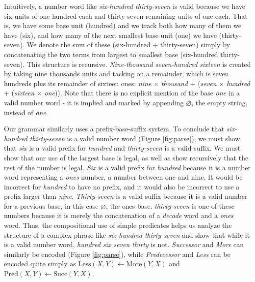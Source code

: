 \documentclass[10pt,letterpaper]{article}
\begin{document}
Intuitively, a number word like \emph{six-hundred thirty-seven} is
valid because we have six units of one hundred each and thirty-seven
remaining units of one each. That is, we have some base unit (hundred)
and we track both how many of them we have (six), and how many of the
next smallest base unit (one) we have (thirty-seven). We denote the
sum of these (six-hundred + thirty-seven) simply by concatenating the
two terms from largest to smallest base (six-hundred thirty-seven).
This structure is recursive. \emph{Nine-thousand seven-hundred
  sixteen} is created by taking nine thousands units and tacking on a
remainder, which is seven hundreds plus its remainder of sixteen ones:
\emph{nine} $\times$ \emph{thousand} $+$ (\emph{seven} $\times$
\emph{hundred} + (\emph{sixteen} $\times$ \emph{one})). Note that
there is no explicit mention of the base \emph{one} in a valid number
word - it is implied and marked by appending $\varnothing$, the empty
string, instead of \emph{one}.

Our grammar similarly uses a prefix-base-suffix system. To conclude
that \emph{six-hundred thirty-seven} is a valid number word (Figure
\ref{fig:parse}), we must show that \emph{six} is a valid prefix for
\emph{hundred} and \emph{thirty-seven} is a valid suffix. We must show
that our use of the largest base is legal, as well as show recursively
that the rest of the number is legal. \emph{Six} is a valid prefix for
\emph{hundred} because it is a number word representing a \emph{ones}
number, a number between one and nine. It would be incorrect for
\emph{hundred} to have no prefix, and it would also be incorrect to
use a prefix larger than \emph{nine}. \emph{Thirty-seven} is a valid
suffix because it is a valid number for a previous base, in this case
$\varnothing$, the ones base. \emph{thirty-seven} is one of these
numbers because it is merely the concatenation of a \emph{decade} word
and a \emph{ones} word. Thus, the compositional use of simple
predicates helps us analyze the structure of a complex phrase like
\emph{six hundred thirty seven} and show that while it is a valid
number word, \emph{hundred six seven thirty} is not. \emph{Successor}
and \emph{More} can similarly be encoded (Figure \ref{fig:parse}),
while \emph{Predecessor} and \emph{Less} can be encoded quite simply
as $\text{Less}(X,Y) \leftarrow \text{More}(Y,X)$ and
$\text{Pred}(X,Y) \leftarrow \text{Succ}(Y,X)$.
\end{document}
